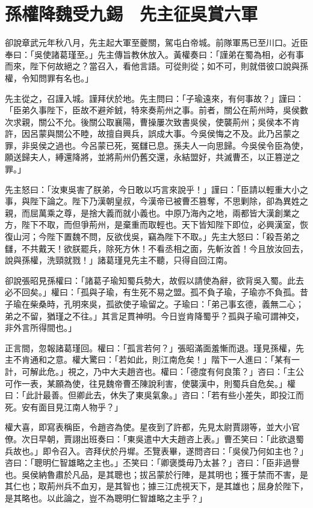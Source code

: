
\chapter{孫權降魏受九錫　先主征吳賞六軍}

卻說章武元年秋八月，先主起大軍至夔關，駕屯白帝城。前隊軍馬已至川口。近臣奉曰：「吳使諸葛瑾至。」先主傳旨教休放入。黃權奏曰：「謹弟在蜀為相，必有事而來，陛下何故絕之？當召入，看他言語。可從則從；如不可，則就借彼口說與孫權，令知問罪有名也。」

先主從之，召謹入城。謹拜伏於地。先主問曰：「子瑜遠來，有何事故？」謹曰：「臣弟久事陛下，臣故不避斧銊，特來奏荊州之事。前者，關公在荊州時，吳侯數次求親，關公不允。後關公取襄陽，曹操屢次致書吳侯，使襲荊州；吳侯本不肯許，因呂蒙與關公不睦，故擅自興兵，誤成大事。今吳侯悔之不及。此乃呂蒙之罪，非吳侯之過也。今呂蒙已死，冤讎已息。孫夫人一向思歸。今吳侯令臣為使，願送歸夫人，縛還降將，並將荊州仍舊交還，永結盟好，共滅曹丕，以正篡逆之罪。」

先主怒曰：「汝東吳害了朕弟，今日敢以巧言來說乎！」謹曰：「臣請以輕重大小之事，與陛下論之。陛下乃漢朝皇叔，今漢帝已被曹丕篡奪，不思剿除，卻為異姓之親，而屈萬乘之尊，是捨大義而就小義也。中原乃海內之地，兩都皆大漢創業之方，陛下不取，而但爭荊州，是棄重而取輕也。天下皆知陛下即位，必興漢室，恢復山河；今陛下置魏不問，反欲伐吳，竊為陛下不取。」先主大怒曰：「殺吾弟之讎，不共戴天！欲朕罷兵，除死方休！不看丞相之面，先斬汝首！今且放汝回去，說與孫權，洗頸就戮！」諸葛瑾見先主不聽，只得自回江南。

卻說張昭見孫權曰：「諸葛子瑜知蜀兵勢大，故假以請使為辭，欲背吳入蜀。此去必不回矣。」權曰：「孤與子瑜，有生死不易之盟。孤不負子瑜，子瑜亦不負孤。昔子瑜在柴桑時，孔明來吳，孤欲使子瑜留之。子瑜曰：「弟己事玄德，義無二心；弟之不留，猶瑾之不往。」其言足貫神明。今日豈肯降蜀乎？孤與子瑜可謂神交，非外言所得間也。」

正言間，忽報諸葛瑾回。權曰：「孤言若何？」張昭滿面羞慚而退。瑾見孫權，先主不肯通和之意。權大驚曰：「若如此，則江南危矣！」階下一人進曰：「某有一計，可解此危。」視之，乃中大夫趙咨也。權曰：「德度有何良策？」咨曰：「主公可作一表，某願為使，往見魏帝曹丕陳說利害，使襲漢中，則蜀兵自危矣。」權曰：「此計最善。但卿此去，休失了東吳氣象。」咨曰：「若有些小差失，即投江而死。安有面目見江南人物乎？」

權大喜，即寫表稱臣，令趙咨為使。星夜到了許都，先見太尉賈詡等，並大小官僚。次日早朝，賈詡出班奏曰：「東吳遣中大夫趙咨上表。」曹丕笑曰：「此欲退蜀兵故也。」即令召入。咨拜伏於丹墀。丕覽表畢，遂問咨曰：「吳侯乃何如主也？」咨曰：「聰明仁智雄略之主也。」丕笑曰：「卿褒獎毋乃太甚？」咨曰：「臣非過譽也。吳侯納魯肅於凡品，是其聰也；拔呂蒙於行陣，是其明也；獲于禁而不害，是其仁也；取荊州兵不血刃，是其智也；據三江虎視天下，是其雄也；屈身於陛下，是其略也。以此論之，豈不為聰明仁智雄略之主乎？」

